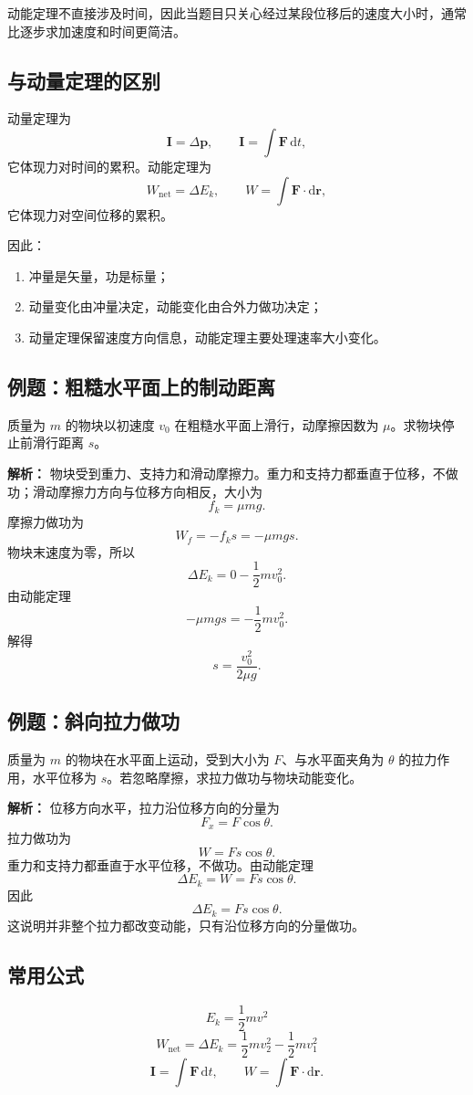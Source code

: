 动能定理不直接涉及时间，因此当题目只关心经过某段位移后的速度大小时，通常比逐步求加速度和时间更简洁。

\subsection{与动量定理的区别}

动量定理为
\[
    \boldsymbol I=\Delta\boldsymbol p,
\qquad
    \boldsymbol I=\int\boldsymbol F\,\mathrm dt,
\]
它体现力对时间的累积。动能定理为
\[
    W_{\mathrm{net}}=\Delta E_k,
\qquad
    W=\int\boldsymbol F\cdot\mathrm d\boldsymbol r,
\]
它体现力对空间位移的累积。

因此：

\begin{enumerate}
    \item 冲量是矢量，功是标量；
    \item 动量变化由冲量决定，动能变化由合外力做功决定；
    \item 动量定理保留速度方向信息，动能定理主要处理速率大小变化。
\end{enumerate}

\subsection{例题：粗糙水平面上的制动距离}

质量为 $m$ 的物块以初速度 $v_0$ 在粗糙水平面上滑行，动摩擦因数为 $\mu$。求物块停止前滑行距离 $s$。

\textbf{解析：} 物块受到重力、支持力和滑动摩擦力。重力和支持力都垂直于位移，不做功；滑动摩擦力方向与位移方向相反，大小为
\[
    f_k=\mu mg.
\]
摩擦力做功为
\[
    W_f=-f_ks=-\mu mgs.
\]
物块末速度为零，所以
\[
    \Delta E_k=0-\frac{1}{2}mv_0^2.
\]
由动能定理
\[
    -\mu mgs=-\frac{1}{2}mv_0^2.
\]
解得
\[
    \boxed{
    s=\frac{v_0^2}{2\mu g}
    } .
\]

\subsection{例题：斜向拉力做功}

质量为 $m$ 的物块在水平面上运动，受到大小为 $F$、与水平面夹角为 $\theta$ 的拉力作用，水平位移为 $s$。若忽略摩擦，求拉力做功与物块动能变化。

\textbf{解析：} 位移方向水平，拉力沿位移方向的分量为
\[
    F_x=F\cos\theta.
\]
拉力做功为
\[
    W=Fs\cos\theta.
\]
重力和支持力都垂直于水平位移，不做功。由动能定理
\[
    \Delta E_k=W=Fs\cos\theta.
\]
因此
\[
    \boxed{
    \Delta E_k=Fs\cos\theta
    } .
\]
这说明并非整个拉力都改变动能，只有沿位移方向的分量做功。

\subsection{常用公式}

\[
    \boxed{
    E_k=\frac{1}{2}mv^2
    }
\]
\[
    \boxed{
    W_{\mathrm{net}}=\Delta E_k
    =
    \frac{1}{2}mv_2^2-\frac{1}{2}mv_1^2
    }
\]
\[
    \boldsymbol I=\int\boldsymbol F\,\mathrm dt,\qquad
    W=\int\boldsymbol F\cdot\mathrm d\boldsymbol r.
\]
